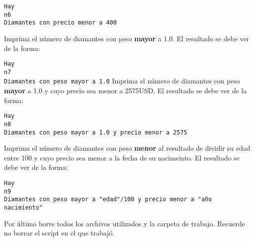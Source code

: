 \documentclass[letterpaper,10pt,onecolumn]{exam}
\begin{document}
\begin{questions}
		\verb|Hay|\\
		\verb|n6|\\
		\verb|Diamantes con precio menor a 400|
	
	\question[10] Imprima el número de diamantes con peso \textbf{mayor} a 1.0. El resultado se debe ver de la forma:
	
		\verb|Hay|\\
		\verb|n7|\\
		\verb|Diamantes con peso mayor a 1.0|
	\question[10] Imprima el número de diamantes con peso \textbf{mayor} a 1.0 y cuyo precio sea menor a 2575USD. El resultado se debe ver de la forma:
	
	\verb|Hay|\\
	\verb|n8|\\
	\verb|Diamantes con peso mayor a 1.0 y precio menor a 2575|  
	
	\question[10] Imprima el número de diamantes con peso \textbf{menor} al resultado de dividir su edad entre 100 y cuyo precio sea menor a la fecha de su nacimeinto. El resultado se debe ver de la forma:
	
	\verb|Hay|\\
	\verb|n9|\\
	\verb|Diamantes con peso mayor a "edad"/100 y precio menor a "año nacimiento"|  
	
	\question[10] Por último borre todos los archivos utilizados y la carpeta de trabajo. Recuerde no borrar el script en el que trabajó.	
	
	
\end{questions}	
\end{document}
